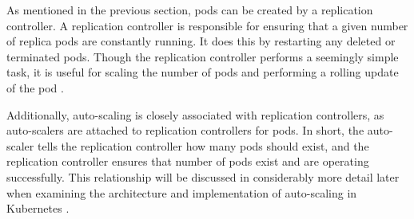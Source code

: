 As mentioned in the previous section, pods can be created by a replication
controller. A replication controller is responsible for ensuring that a given
number of replica pods are constantly running. It does this by restarting any
deleted or terminated pods. Though the replication controller performs a
seemingly simple task, it is useful for scaling the number of pods and
performing a rolling update of the pod \cite{k8s-replication-controllers}.

Additionally, auto-scaling is closely associated with replication controllers, as
auto-scalers are attached to replication controllers for pods. In short, the
auto-scaler tells the replication controller how many pods should exist, and the
replication controller ensures that number of pods exist and are operating
successfully. This relationship will be discussed in considerably more detail later when
examining the architecture and implementation of auto-scaling in Kubernetes
\cite{k8s-horizontal-pod-autoscaler-proposal}.

